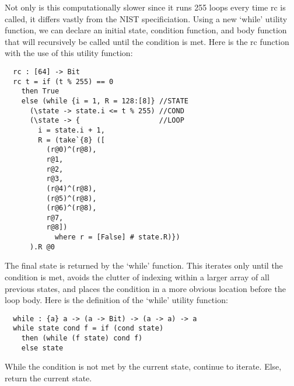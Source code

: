 Not only is this computationally slower since it runs 255 loops every time rc is called,
it differs vastly from the NIST specificiation. Using a new ‘while’ utility function, we 
can declare an initial state, condition function, and body function that will recursively 
be called until the condition is met. Here is the rc function with the use of this utility 
function:

\begin{verbatim}
  rc : [64] -> Bit
  rc t = if (t % 255) == 0 
    then True 
    else (while {i = 1, R = 128:[8]} //STATE
      (\state -> state.i <= t % 255) //COND
      (\state -> {                   //LOOP
        i = state.i + 1, 
        R = (take`{8} ([
          (r@0)^(r@8),
          r@1,
          r@2,
          r@3,
          (r@4)^(r@8),
          (r@5)^(r@8),
          (r@6)^(r@8),
          r@7, 
          r@8]) 
            where r = [False] # state.R)})
      ).R @0
\end{verbatim}

The final state is returned by the ‘while’ function. This iterates only until the 
condition is met, avoids the clutter of indexing within a larger array of all previous 
states, and places the condition in a more obvious location before the loop body. Here 
is the definition of the ‘while’ utility function:

\begin{verbatim}
  while : {a} a -> (a -> Bit) -> (a -> a) -> a
  while state cond f = if (cond state)
    then (while (f state) cond f)	
    else state
\end{verbatim}

While the condition is not met by the current state, continue to iterate. Else, return the 
current state.
